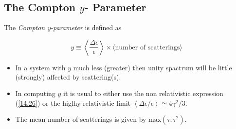 \documentclass[a4paper,11pt,twoside]{article}
\begin{document}
	
	\subsection{ The Compton $y$- Parameter}
	
	The \textit{ Compton y-parameter } is defined as
	
	\begin{equation*}
	\label{14}
	y \equiv \left\langle \frac{\Delta \epsilon}{\epsilon} \right\rangle \times \langle \text{number of
		scatterings} \rangle
	\end{equation*}
	
	\begin{itemize}
		\item In a system with $y$ much less (greater) then unity spactrum will be little (strongly)
		affected by scattering(s).
		\item In computing $y$ it is usual to either use the non relativistic expression (\ref{14.26})
		or the higlhy relativistic limit $ \left \langle \Delta \epsilon / \epsilon \right\rangle \simeq 4
		\gamma^2 /3 $.
		\item The mean number of scatterings is given by $ \text{max}(\tau,\tau^2)$.
	\end{itemize}
	
\end{document}
